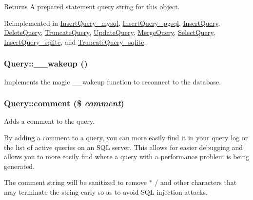 \begin{DoxyReturn}{Returns}
A prepared statement query string for this object. 
\end{DoxyReturn}


Reimplemented in \hyperlink{classInsertQuery__mysql_ab941db654e7813130a9147c74bff0b38}{InsertQuery\_\-mysql}, \hyperlink{classInsertQuery__pgsql_a784c39f2e4fa911ecb893243fcb3ab91}{InsertQuery\_\-pgsql}, \hyperlink{classInsertQuery_a996fb0719632b8861284683c1ff711fa}{InsertQuery}, \hyperlink{classDeleteQuery_a50b6319c4ee1f22b5a055d4ee2f910dc}{DeleteQuery}, \hyperlink{classTruncateQuery_a4a18f66831b99b10cccd74c617fa6723}{TruncateQuery}, \hyperlink{classUpdateQuery_ac85d757de811a3563119e453e8b356a0}{UpdateQuery}, \hyperlink{classMergeQuery_a66c98a8761c91bb633c4ea09ce0c467c}{MergeQuery}, \hyperlink{classSelectQuery_ae5b1bbcecaf13957de15eb49584195b3}{SelectQuery}, \hyperlink{classInsertQuery__sqlite_a67c0e3204921c1a8af4edc3fb60ba97c}{InsertQuery\_\-sqlite}, and \hyperlink{classTruncateQuery__sqlite_a5b051a5c4f35a4c8e91cb7ecb38f7dcf}{TruncateQuery\_\-sqlite}.\hypertarget{classQuery_a1c06bc497d594036c08805b71ce32d05}{
\subsubsection[{\_\-\_\-wakeup}]{\setlength{\rightskip}{0pt plus 5cm}Query::\_\-\_\-wakeup ()}}
\label{classQuery_a1c06bc497d594036c08805b71ce32d05}
Implements the magic \_\-\_\-wakeup function to reconnect to the database. \hypertarget{classQuery_a74f7d00d41c85568f37c828e20fcab32}{
\subsubsection[{comment}]{\setlength{\rightskip}{0pt plus 5cm}Query::comment (\$ {\em comment})}}
\label{classQuery_a74f7d00d41c85568f37c828e20fcab32}
Adds a comment to the query.

By adding a comment to a query, you can more easily find it in your query log or the list of active queries on an SQL server. This allows for easier debugging and allows you to more easily find where a query with a performance problem is being generated.

The comment string will be sanitized to remove $\ast$ / and other characters that may terminate the string early so as to avoid SQL injection attacks.


